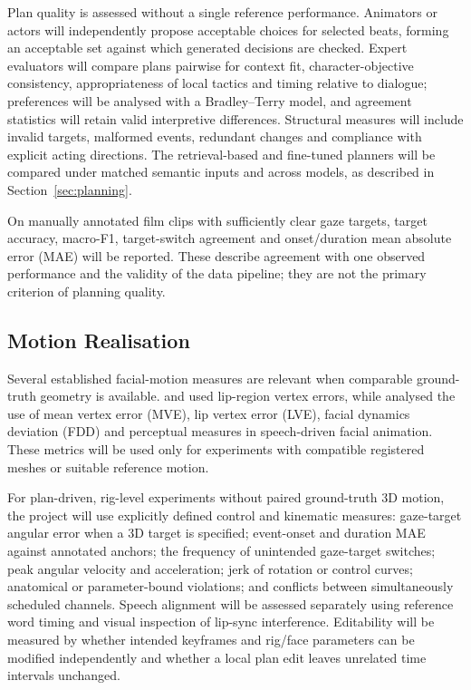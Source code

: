 \documentclass[11pt,a4paper]{article}
\begin{document}
Plan quality is assessed without a single reference performance. Animators or actors will independently propose acceptable choices for selected beats, forming an acceptable set against which generated decisions are checked. Expert evaluators will compare plans pairwise for context fit, character-objective consistency, appropriateness of local tactics and timing relative to dialogue; preferences will be analysed with a Bradley--Terry model, and agreement statistics will retain valid interpretive differences. Structural measures will include invalid targets, malformed events, redundant changes and compliance with explicit acting directions. The retrieval-based and fine-tuned planners will be compared under matched semantic inputs and across models, as described in Section~\ref{sec:planning}.

On manually annotated film clips with sufficiently clear gaze targets, target accuracy, macro-F1, target-switch agreement and onset/duration mean absolute error (MAE) will be reported. These describe agreement with one observed performance and the validity of the data pipeline; they are not the primary criterion of planning quality.

\subsection{Motion Realisation}

Several established facial-motion measures are relevant when comparable ground-truth geometry is available. \citet{fan2022faceformer} and \citet{peng2023emotalk} used lip-region vertex errors, while \citet{haque2025wildwest} analysed the use of mean vertex error (MVE), lip vertex error (LVE), facial dynamics deviation (FDD) and perceptual measures in speech-driven facial animation. These metrics will be used only for experiments with compatible registered meshes or suitable reference motion.

For plan-driven, rig-level experiments without paired ground-truth 3D motion, the project will use explicitly defined control and kinematic measures: gaze-target angular error when a 3D target is specified; event-onset and duration MAE against annotated anchors; the frequency of unintended gaze-target switches; peak angular velocity and acceleration; jerk of rotation or control curves; anatomical or parameter-bound violations; and conflicts between simultaneously scheduled channels. Speech alignment will be assessed separately using reference word timing and visual inspection of lip-sync interference. Editability will be measured by whether intended keyframes and rig/face parameters can be modified independently and whether a local plan edit leaves unrelated time intervals unchanged.
\end{document}
